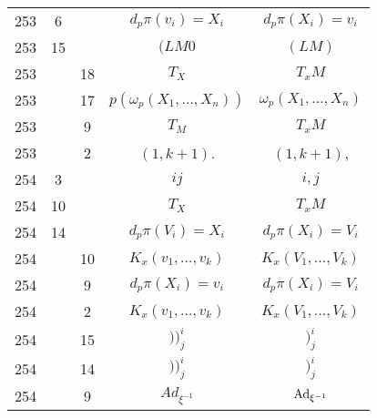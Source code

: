 \documentclass[a4paper,11pt]{article}
\begin{document}
\begin{center}
\begin{tabular}{|c|c|c|c|c|}
    253 & \hphantom{0}6 & & $d_{ p } \pi( v_{ i } ) = X_ { i }$
           & $d_{ p } \pi( X_{ i }) = v_ { i }$ \\
    253 & 15 & & $( LM 0$ & $( LM )$ \\
    253 & & 18 & $T_{ X }$ & $T_{ x }M$ \\
    253 & & 17 & $p( \omega_{ p }( X_{ 1 }, \ldots, X_{ n } ) )$
           & $\omega_{ p }( X_{ 1 }, \ldots, X_{ n } )$ \\
    253 & & \hphantom{0}9 & $T_{ M }$ & $T_{ x }M$ \\
    253 & & \hphantom{0}2 & $( 1, k + 1 )$. & $( 1, k + 1 )$, \\
    254 & \hphantom{0}3 & & $ij$ & $i, j$ \\
    254 & 10 & & $T_{ X }$ & $T_{ x }M$ \\
    254 & 14 & & $d_{ p } \pi( V_{ i } ) = X_{ i }$
           & $d_{ p } \pi( X_{ i } ) = V_{ i }$ \\
    254 & & 10 & $K_{ x }( v_{ 1 }, \ldots, v_{ k } )$
           & $K_{ x }( V_{ 1 }, \ldots, V_{ k } )$ \\
    254 & & \hphantom{0}9 & $d_{ p } \pi( X_{ i } ) = v_{ i }$
           & $d_{ p } \pi( X_{ i } ) = V_{ i }$ \\
    254 & & \hphantom{0}2 & $K_{ x }( v_{ 1 }, \ldots, v_{ k } )$
           & $K_{ x }( V_{ 1 }, \ldots, V_{ k } )$ \\
    254 & & 15 & $) )^{ i }_{ j }$ & $)^{ i }_{ j }$ \\
    254 & & 14 & $) )^{ i }_{ j }$ & $)^{ i }_{ j }$ \\
    254 & & \hphantom{0}9 & $Ad_{ \xi^{ -1 } }$ & $\mathrm{Ad}_{ \xi^{ -1 } }$ \\

\end{tabular}
\end{center}
\end{document}
